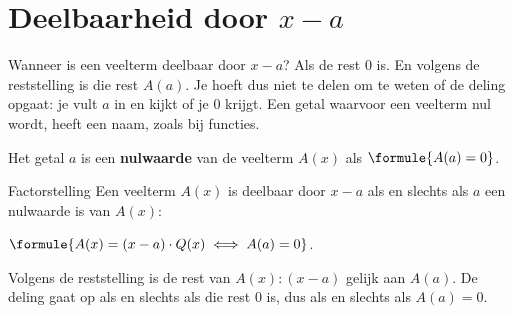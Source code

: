 
\begin{oefeningen}
\end{oefeningen}

\section{Deelbaarheid door \texorpdfstring{$x - a$}{x - a}}

Wanneer is een veelterm deelbaar door $x - a$? Als de rest $0$ is. En volgens de reststelling is die rest $A(a)$. Je hoeft dus niet te delen om te weten of de deling opgaat: je vult $a$ in en kijkt of je $0$ krijgt. Een getal waarvoor een veelterm nul wordt, heeft een naam, zoals bij functies.

\begin{theorie}
Het getal $a$ is een \textbf{\textcolor{accent}{nulwaarde}} van de veelterm $A(x)$ als $\formule{A(a) = 0}$.

\begin{stelling}{Factorstelling}
Een veelterm $A(x)$ is deelbaar door $x - a$ als en slechts als $a$ een nulwaarde is van $A(x)$:

\qquad $\formule{A(x) = (x - a) \cdot Q(x) \iff A(a) = 0}$.
\end{stelling}
\begin{bewijs}
Volgens de reststelling is de rest van $A(x) : (x - a)$ gelijk aan $A(a)$. De deling gaat op als en slechts als die rest $0$ is, dus als en slechts als $A(a) = 0$.
\end{bewijs}
\end{theorie}

